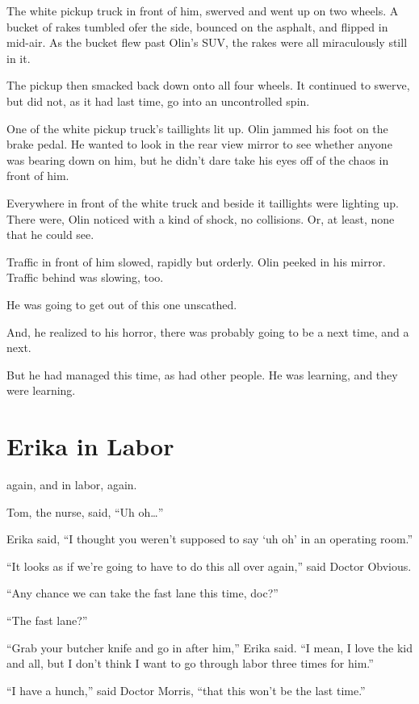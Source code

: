 The white pickup truck in front of him, swerved and went up on two wheels. A bucket of rakes tumbled ofer the side, bounced on the asphalt, and flipped in mid-air. As the bucket flew past Olin's SUV, the rakes were all miraculously still in it.

The pickup then smacked back down onto all four wheels. It continued to swerve, but did not, as it had last time, go into an uncontrolled spin.

One of the white pickup truck's taillights lit up. Olin jammed his foot on the brake pedal. He wanted to look in the rear view mirror to see whether anyone was bearing down on him, but he didn't dare take his eyes off of the chaos in front of him.

Everywhere in front of the white truck and beside it taillights were lighting up. There were, Olin noticed with a kind of shock, no collisions. Or, at least, none that he could see.

Traffic in front of him slowed, rapidly but orderly. Olin peeked in his mirror. Traffic behind was slowing, too.

He was going to get out of this one unscathed.

And, he realized to his horror, there was probably going to be a next time, and a next.

But he had managed this time, as had other people. He was learning, and they were learning.



\chapter{Erika in Labor}

 again, and in labor, again.

Tom, the nurse, said, ``Uh oh…''

Erika said, ``I thought you weren't supposed to say `uh oh' in an operating room.''

``It looks as if we're going to have to do this all over again,'' said Doctor Obvious.

``Any chance we can take the fast lane this time, doc?''

``The fast lane?''

``Grab your butcher knife and go in after him,'' Erika said. ``I mean, I love the kid and all, but I don't think I want to go through labor three times for him.''

``I have a hunch,'' said Doctor Morris, ``that this won't be the last time.''

